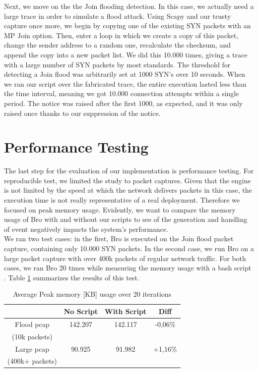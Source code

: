 Next, we move on the the Join flooding detection. In this case, we actually need a large trace in order to simulate a flood attack. Using Scapy and our trusty capture once more, we begin by copying one of the existing SYN packets with an MP Join option. Then, enter a loop in which we create a copy of this packet, change the sender address to a random one, recalculate the checksum, and append the copy into a new packet list. We did this 10.000 times, giving a trace with a large number of SYN packets by most standards. The threshold for detecting a Join flood was arbitrarily set at 1000 SYN's over 10 seconds. When we ran our script over the fabricated trace, the entire execution lasted less than the time interval, meaning we got 10.000 connection attempts within a single period. The notice was raised after the first 1000, as expected, and it was only raised once thanks to our suppression of the notice.

\section{Performance Testing}
The last step for the evaluation of our implementation is performance testing. For reproducible test, we limited the study to packet captures. Given that the engine is not limited by the speed at which the network delivers packets in this case, the execution time is not really representative of a real deployment. Therefore we focused on peak memory usage. Evidently, we want to compare the memory usage of Bro with and without our scripts to see of the generation and handling of event negatively impacts the system's performance.\\

We ran two test cases: in the first, Bro is executed on the Join flood packet capture, containing only 10.000 SYN packets. In the second case, we run Bro on a large packet capture with over 400k packets of regular network traffic. For both cases, we ran Bro 20 times while measuring the memory usage with a bash script \cite{memusg}. Table \ref{table:perf} summarizes the results of this test.\\

\begin{table}
\centering
\begin{tabular}{| c | c | c | c |}
\hline
 & No Script & With Script & Diff \\ \hline
Flood pcap & 142.207 & 142.117 & -0,06\% \\
(10k packets) & & & \\ \hline
Large pcap & 90.925 & 91.982 & +1,16\% \\
(400k+ packets) & &  & \\ \hline
\end{tabular}
\caption{Average Peak memory [KB] usage over 20 iterations}
\label{table:perf}
\end{table}

